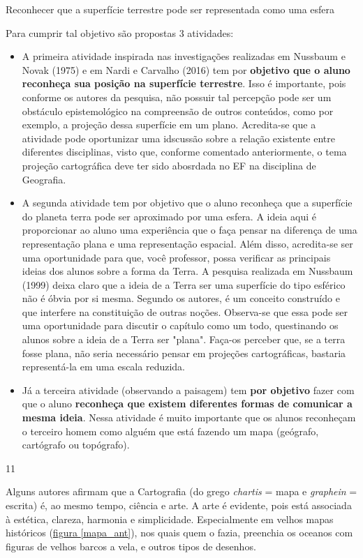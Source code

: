 \begin{ObjetivoEsp}{Reconhecer que a superfície terrestre pode ser representada como uma esfera}
{
	Para cumprir tal objetivo são propostas 3 atividades:
	\begin{itemize}
	\item A primeira atividade inspirada nas investigações realizadas em Nussbaum e Novak (1975) e em Nardi e Carvalho (2016) tem por \textbf{objetivo que o aluno reconheça sua posição na superfície terrestre}. Isso é importante, pois conforme os autores da pesquisa, não possuir tal percepção pode ser um obstáculo epistemológico na compreensão de outros conteúdos, como por exemplo, a projeção dessa superfície em um plano. Acredita-se que a atividade pode oportunizar uma idscussão sobre a relação existente entre diferentes disciplinas, visto que, conforme comentado anteriormente, o tema projeção cartográfica deve ter sido abosrdada no EF na disciplina de Geografia.
	\item A segunda atividade tem por objetivo que o aluno reconheça que a superfície do planeta terra pode ser aproximado por uma esfera. A ideia aqui é proporcionar ao aluno uma experiência que o faça pensar na diferença de uma representação plana e uma representação espacial. Além disso, acredita-se ser uma oportunidade para que, você professor, possa verificar as principais ideias dos alunos sobre a forma da Terra. A pesquisa realizada em Nussbaum (1999) deixa claro que a ideia de a Terra ser uma superfície do tipo esférico não é óbvia por si mesma. Segundo os autores, é um conceito construído e que interfere na constituição de outras noções. Observa-se que essa pode ser uma oportunidade para discutir o capítulo como um todo, questinando os alunos sobre a ideia de a Terra ser "plana". Faça-os perceber que, se a terra fosse plana, não seria necessário pensar em projeções cartográficas, bastaria representá-la em uma escala reduzida.
	\item Já a terceira atividade (observando a paisagem) tem \textbf{por objetivo} fazer com que o aluno \textbf{reconheça que existem diferentes formas de comunicar a mesma ideia}. Nessa atividade é muito importante que os alunos reconheçam o terceiro homem como alguém que está fazendo um mapa (geógrafo, cartógrafo ou topógrafo).
	\end{itemize}
}
{1}{1}
\end{ObjetivoEsp}

\label{cart_1}

Alguns autores afirmam que a Cartografia (do grego \textit{chartis} = mapa e \textit{graphein} = escrita) é, ao mesmo tempo, ciência e arte.  A arte é evidente, pois está associada à estética, clareza, harmonia e simplicidade. Especialmente em velhos mapas históricos (\hyperref[mapa_ant]{figura \ref{mapa_ant}}), nos quais quem o fazia, preenchia os oceanos com figuras de velhos barcos a vela, e outros tipos de desenhos.

